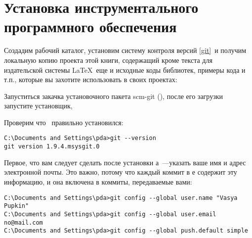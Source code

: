 
\section{Установка инструментального программного обеспечения}


Создадим рабочий каталог, установим систему контроля версий \git\ref{git}\ и 
получим локальную копию проекта этой книги, содержащий кроме текста для издательской системы
\LaTeX\ еще и исходные коды библиотек, примеры кода и т.п., которые вы захотите
использовать в своих проектах:

\bigskip{}

Запуститься закачка установочного пакета scm-git (), после его загрузки
запустите установщик, 

\bigskip
{}

\bigskip
{} 

\bigskip
{}

\bigskip
{}

\bigskip
{}

\bigskip
{}

\bigskip
{}

\bigskip
{}

\bigskip
Проверим что \git\ правильно установился:

\bigskip{}

\bigskip
\begin{lstlisting}[style=con]
C:\Documents and Settings\pda>git --version
git version 1.9.4.msysgit.0
\end{lstlisting}

\bigskip
Первое, что вам следует сделать после установки \git а\ ---указать ваше имя и
адрес электронной почты. Это важно, потому что каждый коммит в \git е содержит
эту информацию, и она включена в коммиты, передаваемые вами:
\begin{lstlisting}[style=con]
C:\Documents and Settings\pda>git config --global user.name "Vasya Pupkin"
C:\Documents and Settings\pda>git config --global user.email no@mail.com
C:\Documents and Settings\pda>git config --global push.default simple
\end{lstlisting}

